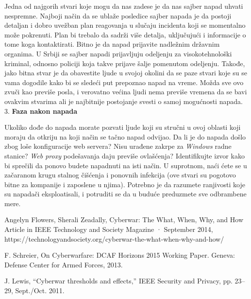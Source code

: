 \documentclass[a4paper]{article}
\begin{document}
{Jedna od najgorih stvari koje mogu da nas zadese je da nas sajber napad uhvati nespremne. Najboji način da se ublaže posledice sajber napada je da postoji detaljan i dobro uvežban plan reagovanja u slučaju incidenta koji se momentalno može pokrenuti. Plan bi trebalo da sadrži više detalja, uključujući i informacije o tome koga kontaktirati. Bitno je da napad prijavite nadležnim državnim organima. U Srbiji se sajber napadi prijavljuju odeljenju za visokotehnološki kriminal, odnosno policiji koja takve prijave šalje pomenutom odeljenju. Takođe, jako bitna stvar je da obavestite ljude u svojoj okolini da se paze stvari koje su se vama dogodile kako bi se sledeći put prepoznao napad na vreme. Možda sve ovo zvuči kao previše posla, i verovatno većina ljudi nema previše vremena da se bavi ovakvim stvarima ali je najbitnije postojanje svesti o samoj mogućnosti napada.\\
3. \textbf{Faza nakon napada}

Ukoliko dođe do napada morate pozvati ljude koji su stručni u ovoj oblasti koji moraju da otkriju na koji način se tačno napad odvijao. Da li je do napada došlo zbog loše konfiguracije web servera? Nisu urađene zakrpe za \emph{Windows} radne stanice? \emph{Web proxy} podešavanja daju previše ovlašćenja? Identifikujte izvor kako bi sprečili da ponovo budete napadnuti na isti način. U suprotnom, naći ćete se u začaranom krugu stalnog čišćenja i ponovnih infekcija (ove stvari su pogotovo bitne za kompanije i zaposlene u njima). Potrebno je da razumete ranjivosti koje su napadači eksploatisali, i potruditi se da u buduće preduzmete sve odbrambene mere.


  

\appendix

\begin{thebibliography}{9}

 Angelyn Flowers, Sherali Zeadally, Cyberwar: The What, When, Why, and How
  Article in IEEE Technology and Society Magazine · September 2014,
  https://technologyandsociety.org/cyberwar-the-what-when-why-and-how/

 F. Schreier, On Cyberwarfare: DCAF Horizons 2015 Working
Paper. Geneva: Defense Center for Armed Forces, 2013.

 J. Lewis, “Cyberwar thresholds and effects,” IEEE Security and
Privacy, pp. 23–29, Sept./Oct. 2011.


\end{thebibliography}}
\end{document}
